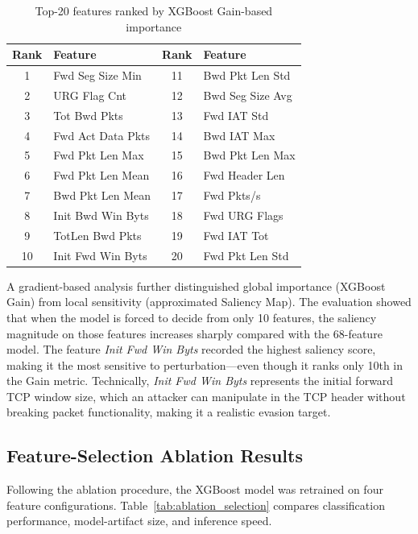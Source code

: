 \documentclass[11pt, a4paper]{article}
\begin{document}
\begin{table}[H]
\caption{Top-20 features ranked by XGBoost Gain-based importance}
\label{tab:feature_importance}
\centering
\small
\begin{tabular}{@{}cl cl@{}}
\toprule
\textbf{Rank} & \textbf{Feature} & \textbf{Rank} & \textbf{Feature} \\ \midrule
1  & Fwd Seg Size Min   & 11 & Bwd Pkt Len Std \\
2  & URG Flag Cnt       & 12 & Bwd Seg Size Avg \\
3  & Tot Bwd Pkts       & 13 & Fwd IAT Std \\
4  & Fwd Act Data Pkts  & 14 & Bwd IAT Max \\
5  & Fwd Pkt Len Max    & 15 & Bwd Pkt Len Max \\
6  & Fwd Pkt Len Mean   & 16 & Fwd Header Len \\
7  & Bwd Pkt Len Mean   & 17 & Fwd Pkts/s \\
8  & Init Bwd Win Byts  & 18 & Fwd URG Flags \\
9  & TotLen Bwd Pkts    & 19 & Fwd IAT Tot \\
10 & Init Fwd Win Byts  & 20 & Fwd Pkt Len Std \\ \bottomrule
\end{tabular}
\end{table}

A gradient-based analysis further distinguished global importance (XGBoost Gain) from local sensitivity (approximated Saliency Map). The evaluation showed that when the model is forced to decide from only 10 features, the saliency magnitude on those features increases sharply compared with the 68-feature model. The feature \textit{Init Fwd Win Byts} recorded the highest saliency score, making it the most sensitive to perturbation---even though it ranks only 10th in the Gain metric. Technically, \textit{Init Fwd Win Byts} represents the initial forward TCP window size, which an attacker can manipulate in the TCP header without breaking packet functionality, making it a realistic evasion target.

\subsection{Feature-Selection Ablation Results}
Following the ablation procedure, the XGBoost model was retrained on four feature configurations. Table~\ref{tab:ablation_selection} compares classification performance, model-artifact size, and inference speed.
\end{document}
